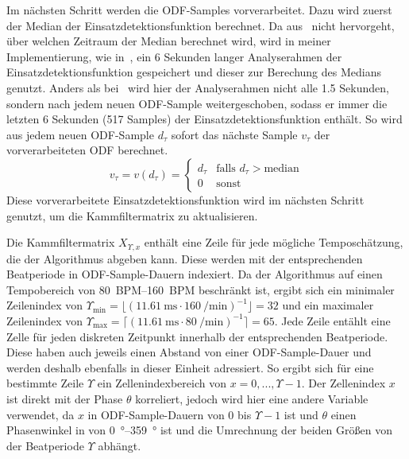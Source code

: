 {{{			%
			Im nächsten Schritt werden die ODF-Samples vorverarbeitet.
			Dazu wird zuerst der Median der Einsatzdetektionsfunktion berechnet.
			Da aus~\cite{2011_PlRoSt} nicht hervorgeht, über welchen Zeitraum der Median berechnet wird,
				wird in meiner Implementierung,
				wie in~\cite{2009_DaPlSt},
				ein \num{6} Sekunden langer Analyserahmen der Einsatzdetektionsfunktion gespeichert
				und dieser zur Berechung des Medians genutzt.
			Anders als bei~\cite{2009_DaPlSt} wird hier der Analyserahmen nicht alle \num{1.5} Sekunden,
				sondern nach jedem neuen ODF-Sample weitergeschoben,
				sodass er immer die letzten \num{6} Sekunden (\num{517} Samples) der Einsatzdetektionsfunktion enthält.
			So wird aus jedem neuen ODF-Sample $d_\tau$ sofort das nächste Sample $v_\tau$ der vorverarbeiteten ODF berechnet.
			\begin{equation}
				v_\tau = v(d_\tau) =
				\begin{cases}
					d_\tau & \text{falls } d_\tau > \text{median} \\
					0    & \text{sonst}
				\end{cases}
			\end{equation}
			Diese vorverarbeitete Einsatzdetektionsfunktion wird im nächsten Schritt genutzt,
				um die Kammfiltermatrix zu aktualisieren.

			Die Kammfiltermatrix $X_{\Upsilon, x}$ enthält eine Zeile für jede mögliche Temposchätzung, die der Algorithmus abgeben kann.
			Diese werden mit der entsprechenden Beatperiode in ODF-Sample-Dauern indexiert.
			Da der Algorithmus auf einen Tempobereich von \SIrange{80}{160}{BPM} beschränkt ist,
				ergibt sich ein minimaler Zeilenindex von
				$\Upsilon_{\text{min}} = \lfloor(\SI{11.61}{\milli\second} \cdot \SI{160}{\per\minute})^{-1}\rfloor = 32$
				und ein maximaler Zeilenindex von
				$\Upsilon_{\text{max}} = \lceil(\SI{11.61}{\milli\second} \cdot \SI{80}{\per\minute})^{-1}\rceil = 65$.
			Jede Zeile entählt eine Zelle für jeden diskreten Zeitpunkt innerhalb der entsprechenden Beatperiode.
			Diese haben auch jeweils einen Abstand von einer ODF-Sample-Dauer
				und werden deshalb ebenfalls in dieser Einheit adressiert.
			So ergibt sich für eine bestimmte Zeile $\Upsilon$ ein Zellenindexbereich von $x = 0, ..., \Upsilon - 1$.
			Der Zellenindex $x$ ist direkt mit der Phase $\theta$ korreliert,
				jedoch wird hier eine andere Variable verwendet,
				da $x$ in ODF-Sample-Dauern von $0$ bis $\Upsilon - 1$ ist
				und $\theta$ einen Phasenwinkel in von \SIrange{0}{359}{\degree} ist
				und die Umrechnung der beiden Größen von der Beatperiode $\Upsilon$ abhängt.

}}}
